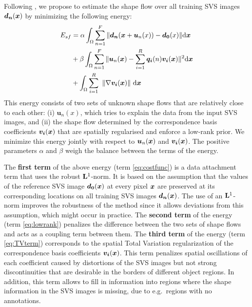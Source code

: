 Following \cite{Garg:2013hu}, we propose to estimate the shape flow over all training SVS images $\bm{d_n}(\boldsymbol{x})$ by minimizing the following energy:
\begin{align}
E_{sf} & =\alpha
\int_{\Omega}\sum_{n=1}^F \|\bm{d_n}(\boldsymbol{x}+\bm{u}_n(x))-\bm{d_0}(x)\| \mathrm{d} \boldsymbol{x} \label{eq:costfunc}\\
    &+ \beta \int_{\Omega}\sum_{n=1}^F\|\bm{u}_n(\boldsymbol{x})-\sum_{i=1}^R\bm{q_i}(n)\bm{v_i}(\boldsymbol{x})\|^2 \mathrm{d} \boldsymbol{x} \label{eq:lowrank}\\
    &+
\int_\Omega  \sum_{i=1}^R \,\, \left \|    \nabla \bm{v_i}(\boldsymbol{x})    \right \|  \,\mathrm{d} \boldsymbol{x} \label{eq:TVterm}
\end{align}
This energy consists of two sets of unknown shape flows that are relatively close to each other: (i) $\bm{u}_n(x)$, which tries to explain the data from the input SVS images, and (ii) the shape flow determined by the correspondence basis coefficients $\bm{v_i}(\boldsymbol{x})$ that are spatially regularised and enforce a low-rank prior. We minimize this energy jointly with respect to $\bm{u}_n(\boldsymbol{x})$ and $\bm{v_i}(\boldsymbol{x})$. The positive parameters $\alpha$ and $\beta$ weigh the balance between the terms of the energy.

The \textbf{first term} of the above energy (term \eqref{eq:costfunc}) is a data attachment term
that uses the robust $\mathbf{L}^1$-norm.  It is based on the assumption that the values of the reference SVS image $\bm{d_0}(\boldsymbol{x})$ at every pixel $\boldsymbol{x}$ are preserved at its corresponding locations on all training SVS images $\bm{d_n}(\boldsymbol{x})$. The use of an $\mathbf{L}^1$-norm improves the robustness of the method since it allows deviations from this assumption, which might occur in practice.
The \textbf{second term} of the energy (term \eqref{eq:lowrank}) penalizes the difference between the two sets  of shape flows and acts as a coupling term between them.
The \textbf{third term} of the energy (term \eqref{eq:TVterm}) corresponds to the spatial Total Variation regularization \cite{rudin92} of
the correspondence basis coefficients $\bm{v_i}(\boldsymbol{x})$.
This term penalizes spatial oscillations of each coefficient caused by distortions of the SVS images but not strong discontinuities that are desirable in the borders of different object regions. In addition, this term allows to fill in information into regions where the shape information in the SVS images is missing, due to e.g.~regions with no annotations.

